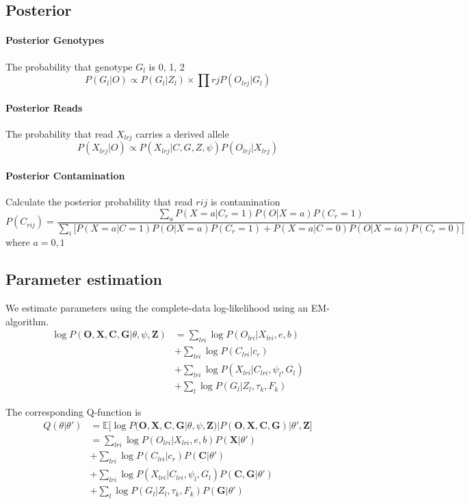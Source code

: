 \documentclass[10pt,a4paper]{article}
\begin{document}
\subsection*{Posterior}
\paragraph{Posterior Genotypes}
The probability that genotype $G_l$ is 0, 1, 2
$$P(G_l | O) \propto P(G_l | Z_l) \times \prod{rj} P(O_{lrj} | G_l)$$

\paragraph{Posterior Reads}
The probability that read $X_{lrj}$ carries a derived allele
$$P(X_{lrj} | O) \propto P(X_{lrj} | C, G, Z, \psi) P(O_{lrj} | X_{lrj})$$
\paragraph{Posterior Contamination}
Calculate the posterior probability that read $rij$ is contamination
$$P(C_{rij})  = \frac{\sum_a P(X=a|C_r=1) P(O|X=a) P(C_r=1)}{\sum_i \big[ P(X=a|C=1) P(O|X=a)P(C_r=1) +  P(X=a|C=0) P(O|X=ia)P(C_r=0)\big]}$$
where $a=0,1$

\subsection*{Parameter estimation}
We estimate parameters using the complete-data log-likelihood using an EM-algorithm.
\begin{align*}
\log P(\mathbf{O}, \mathbf{X}, \mathbf{C}, \mathbf{G} | \theta, \psi, \mathbf{Z}) &= 
\sum_{lri} \log P(O_{lri} | X_{lri}, e, b)\\
&+ \sum_{lri}\log P(C_{lri} | c_r)\\
&+ \sum_{lri}\log P(X_{lri} | C_{lri}, \psi_l, G_l)\\
&+ \sum_{l} \log P( G_l | Z_l, \tau_k, F_k)
\end{align*}

The corresponding Q-function is \begin{align*}
Q(\theta | \theta') &= \mathbb{E}\big[\log P(\mathbf{O}, \mathbf{X}, \mathbf{C}, \mathbf{G} | \theta, \psi, \mathbf{Z}) | P(\mathbf{O, X, C, G}) | \theta', \mathbf{Z} \big]\\ &= 
\sum_{lri} \log P(O_{lri} | X_{lri}, e, b) P(\mathbf{X} | \theta')\\
&+ \sum_{lri}\log P(C_{lri} | c_r) P(\mathbf{C} | \theta')\\
&+ \sum_{lri}\log P(X_{lri} | C_{lri}, \psi_l, G_l)P(\mathbf{C,G} | \theta')\\
&+ \sum_{l} \log P( G_l | Z_l, \tau_k, F_k) P(\mathbf{G} | \theta')
\end{align*}
\end{document}
